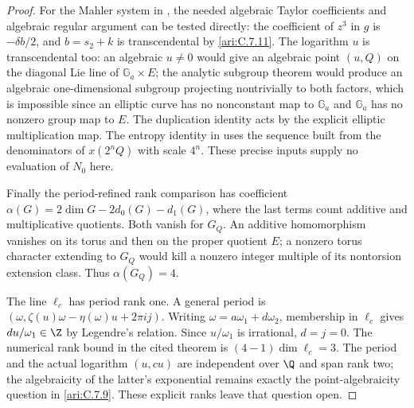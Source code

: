 \begin{proof}
For the Mahler system in
\citep[Theorem1.1 and system(1.2)]{adamczewski2017mahler},
the needed algebraic Taylor coefficients and algebraic regular
argument can be tested directly: the coefficient of $z^3$ in
$g$ is $-\delta b/2$, and $b=s_2+k$ is transcendental by
\ref{ari:C.7.11}. The logarithm $u$ is transcendental too:
an algebraic $u\ne0$ would give an algebraic point $(u,Q)$
on the diagonal Lie line of $\mathbb G_a\times E$; the analytic
subgroup theorem would produce an algebraic one-dimensional
subgroup projecting nontrivially to both factors, which is
impossible since an elliptic curve has no nonconstant map to
$\mathbb G_a$ and $\mathbb G_a$ has no nonzero group map to $E$.
The duplication identity acts by the explicit elliptic
multiplication map. The entropy identity in
\citep[Theorem5.1]{einsiedler2001entropy} uses the sequence
built from the denominators of $x(2^nQ)$ with scale $4^n$.
These precise inputs supply no evaluation of $N_0$ here.

Finally the period-refined rank comparison
\citep[Theorem4.1 and Corollary4.3]{waldschmidt1988periodrank}
\citep[main theorem,p.363]{roy1993periodrank}
has coefficient $\alpha(G)=2\dim G-2d_0(G)-d_1(G)$,
where the last terms count additive and multiplicative
quotients. Both vanish for $G_Q$. An additive homomorphism
vanishes on its torus and then on the proper quotient $E$;
a nonzero torus character extending to $G_Q$ would kill a
nonzero integer multiple of its nontorsion extension class.
Thus $\alpha(G_Q)=4$.

The line $\ell_c$ has period rank one. A general period is
$(\omega,\zeta(u)\omega-\eta(\omega)u+2\pi i j)$.
Writing $\omega=a\omega_1+d\omega_2$, membership in
$\ell_c$ gives $du/\omega_1\in\Z$ by Legendre's relation.
Since $u/\omega_1$ is irrational, $d=j=0$. The numerical
rank bound in the cited theorem is
$(4-1)\dim\ell_c=3$. The period and the actual logarithm
$(u,cu)$ are independent over $\Q$ and span rank two;
the algebraicity of the latter's exponential remains exactly
the point-algebraicity question in \ref{ari:C.7.9}. These
explicit ranks leave that question open.
\end{proof}
